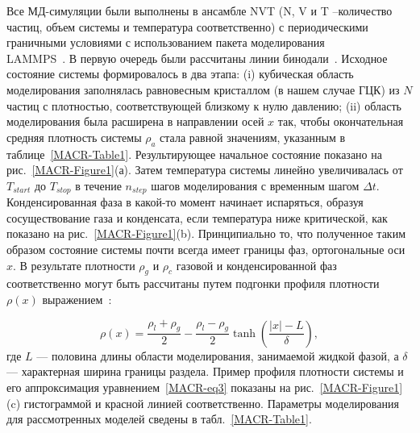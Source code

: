 Все МД-симуляции были выполнены в ансамбле NVT (N, V и T --количество частиц, объем системы и температура соответственно) с периодическими граничными условиями с использованием пакета моделирования \\  LAMMPS~\cite{10.1006/jcph.1995.1039}.
В первую очередь были рассчитаны линии бинодали~\cite{10.1021/jp806127j, 10.1021/jp1117213}.
Исходное состояние системы формировалось в два этапа: (i) кубическая область моделирования заполнялась равновесным кристаллом (в нашем случае ГЦК) из $N$ частиц с плотностью, соответствующей близкому к нулю давлению; 
(ii) область моделирования была расширена в направлении осей $x$ так, чтобы окончательная средняя плотность системы $\rho_a$ стала равной значениям, указанным в таблице~\ref{MACR-Table1}.
Результирующее начальное состояние показано на рис.~\ref{MACR-Figure1}(а). 
Затем температура системы линейно увеличивалась от $T_{start}$ до $T_{stop}$ в течение $n_{step}$ шагов моделирования с временным шагом $\Delta t$.
Конденсированная фаза в какой-то момент начинает испаряться, образуя сосуществование газа и конденсата, если температура ниже критической, как показано на рис.~\ref{MACR-Figure1}(b).
Принципиально то, что полученное таким образом состояние системы почти всегда имеет границы фаз, ортогональные оси $x$.
В результате плотности $\rho_g$ и $\rho_c$ газовой и конденсированной фаз соответственно могут быть рассчитаны путем подгонки профиля плотности $\rho(x)$ выражением~\cite{10.1021/jp806127j, 10.1021/jp1117213}:

\begin{equation}
  \rho(x)=\frac{\rho_{l}+\rho_{g}}{2}-\frac{\rho_{l}-\rho_{g}}{2} \tanh \left(\frac{|x|-L}{\delta}\right),
  \label{MACR-eq3}
\end{equation}
где $L$ — половина длины области моделирования, занимаемой жидкой фазой, а $\delta$ — характерная ширина границы раздела.
Пример профиля плотности системы и его аппроксимация уравнением~\eqref{MACR-eq3} показаны на рис.~\ref{MACR-Figure1}(c) гистограммой и красной линией соответственно.
Параметры моделирования для рассмотренных моделей сведены в табл.~\ref{MACR-Table1}.


